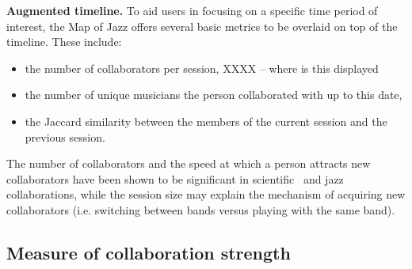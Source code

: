 \documentclass[12pt]{cmuthesis}
\begin{document}
  
  \textbf{Augmented timeline.} To aid users in focusing on a specific time period of interest, the Map of Jazz offers several basic metrics to be overlaid on top of the timeline. These include: 
  \begin{itemize}
    \item the number of collaborators per session, XXXX -- where is this displayed
    \item the number of unique musicians the person collaborated with up to this date,
    \item the Jaccard similarity between the members of the current session and the previous session.
  \end{itemize}
  The number of collaborators and the speed at which a person attracts new collaborators have been shown to be significant in scientific~\cite{Petersen2012} and jazz~\cite{Pinheiro2009} collaborations, while the session size may explain the mechanism of acquiring new collaborators (i.e. switching between bands versus playing with the same band).



  \subsection{Measure of collaboration strength}
\end{document}
